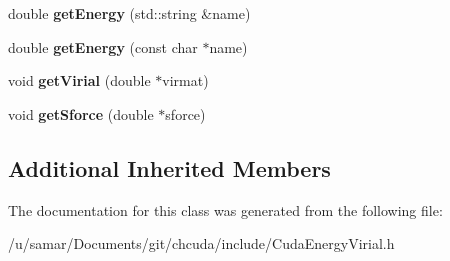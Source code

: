 \begin{DoxyCompactItemize}
double {\bfseries get\+Energy} (std\+::string \&name)
\item 
\hypertarget{classCudaEnergyVirial_ab834443e15f701d1f8613f738b21ed6e}{}\label{classCudaEnergyVirial_ab834443e15f701d1f8613f738b21ed6e} 
double {\bfseries get\+Energy} (const char $\ast$name)
\item 
\hypertarget{classCudaEnergyVirial_a7a18adcc1edd0e33b3586e4098810e8c}{}\label{classCudaEnergyVirial_a7a18adcc1edd0e33b3586e4098810e8c} 
void {\bfseries get\+Virial} (double $\ast$virmat)
\item 
\hypertarget{classCudaEnergyVirial_a101478267c320a2c6b65b2f8a2079440}{}\label{classCudaEnergyVirial_a101478267c320a2c6b65b2f8a2079440} 
void {\bfseries get\+Sforce} (double $\ast$sforce)
\end{DoxyCompactItemize}
\subsection*{Additional Inherited Members}


The documentation for this class was generated from the following file\+:\begin{DoxyCompactItemize}
\item 
/u/samar/\+Documents/git/chcuda/include/Cuda\+Energy\+Virial.\+h\end{DoxyCompactItemize}

